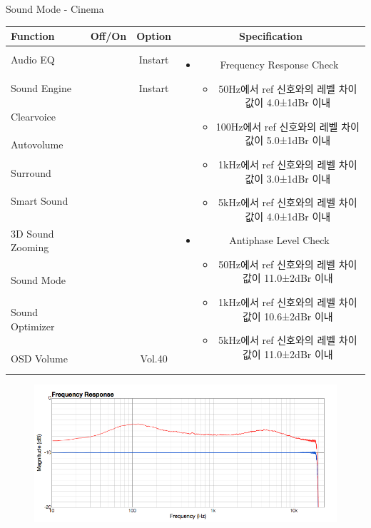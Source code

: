 \begin{frame}[t]{Sound Mode - Cinema}
\begin{tiny}
\begin{tabular}{@{}lccc@{}}
\toprule
Function & Off/On & Option & Specification \\
\midrule
Audio EQ & \color{black}{Off} & Instart &
\multirow{10}{60mm}{
\begin{itemize}
\item Frequency Response Check
	\begin{itemize}
	\item 50Hz에서 ref 신호와의 레벨 차이값이 4.0±1dBr 이내
	\item 100Hz에서 ref 신호와의 레벨 차이값이 5.0±1dBr 이내
	\item 1kHz에서 ref 신호와의 레벨 차이값이 3.0±1dBr 이내
	\item 5kHz에서 ref 신호와의 레벨 차이값이 4.0±1dBr 이내
	\end{itemize}
\item Antiphase Level Check
	\begin{itemize}
	\item 50Hz에서 ref 신호와의 레벨 차이값이 11.0±2dBr 이내
	\item 1kHz에서 ref 신호와의 레벨 차이값이 10.6±2dBr 이내
	\item 5kHz에서 ref 신호와의 레벨 차이값이 11.0±2dBr 이내
	\end{itemize}
\end{itemize}
} \\
Sound Engine & \color{blue}{On} & Instart & \\
Clearvoice & \color{black}{Off} & & \\
Autovolume & \color{black}{Off} & & \\
Surround & \color{black}{Off} & & \\
Smart Sound & \color{black}{Off} & & \\
3D Sound Zooming & \color{black}{Off} & & \\
Sound Mode & \color{blue}{On} & \color{blue}{Cinema} & \\
Sound Optimizer & \color{black}{Off} & & \\
OSD Volume & \color{blue}{On} & Vol.40 & \\
\midrule
\end{tabular}
\end{tiny}

\begin{figure}[b]
\includegraphics[height=0.4\textwidth]{figures/cinema_12.png}
\end{figure}

\end{frame}